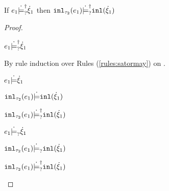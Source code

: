\begin{lemma}
  \label{lem:satormay-inl}
  If $e_1 \dot{\models}_{?}^{\dag} \dot{\xi}_1$ then $\mathtt{inl}_{\tau_2}({e_1}) \dot{\models}_{?}^{\dag} \mathtt{inl}(\dot{\xi}_1)$
\end{lemma}
\begin{proof}
  \begin{pfsteps*}
  \item $e_1 \dot{\models}_{?}^{\dag} \dot{\xi}_1$  
  \end{pfsteps*}
  By rule induction over Rules (\ref{rules:satormay}) on .
  \begin{byCases}

  \item[\text{(\ref{rule:CSMSSat})}]
    \begin{pfsteps*}
    \item $e_1 \dot{\models} \dot{\xi}_1$  
    \item $\mathtt{inl}_{\tau_2}({e_1}) \dot{\models} \mathtt{inl}(\dot{\xi}_1)$  
    \item $\mathtt{inl}_{\tau_2}({e_1}) \dot{\models}_{?}^{\dag} \mathtt{inl}(\dot{\xi}_1)$ 
    \end{pfsteps*}

  \item[\text{(\ref{rule:CSMSMay})}]
    \begin{pfsteps*}
    \item $e_1 \dot{\models}_{?} \dot{\xi}_1$  
    \item $\mathtt{inl}_{\tau_2}({e_1}) \dot{\models}_{?} \mathtt{inl}(\dot{\xi}_1)$  
    \item $\mathtt{inl}_{\tau_2}({e_1}) \dot{\models}_{?}^{\dag} \mathtt{inl}(\dot{\xi}_1)$ 
    \end{pfsteps*}
  \end{byCases}
  \resetpfcounter
\end{proof}

